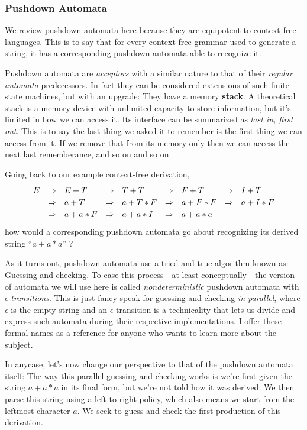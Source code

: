 \documentclass[twoside]{article}
\newcommand{\RA}{\Rightarrow}
\newcommand{\strong}[1]{{\bfseries #1}}
\begin{document}
\subsubsection*{Pushdown Automata}

We review pushdown automata here because they are equipotent to context-free languages. This is to say that for every
context-free grammar used to generate a string, it has a corresponding pushdown automata able to recognize it.

Pushdown automata are \emph{acceptors} with a similar nature to that of their \emph{regular automata} predecessors.
In fact they can be considered extensions of such finite state machines, but with an upgrade: They have a memory
\strong{stack}. A theoretical stack is a memory device with unlimited capacity to store information, but it's
limited in how we can access it. Its interface can be summarized as \emph{last in, first out}. This is to say
the last thing we asked it to remember is the first thing we can access from it. If we remove that from its
memory only then we can access the next last rememberance, and so on and so on.

Going back to our example context-free derivation,
$$ \def\arraystretch{1.2}
\begin{array}{rclllllll}
E	& \RA & E+T	& \RA & T+T	& \RA & F+T	& \RA & I+T		\\
	& \RA & a+T	& \RA & a+T*F	& \RA & a+F*F	& \RA & a+I*F		\\
	& \RA & a+a*F	& \RA & a+a*I	& \RA & a+a*a
\end{array} $$
how would a corresponding pushdown automata go about recognizing its derived string ``$ a+a*a $'' ?

As it turns out, pushdown automata use a tried-and-true algorithm known as: Guessing and checking. To ease this
process---at least conceptually---the version of automata we will use here is called \emph{nondeterministic}
pushdown automata with $ \epsilon $-\emph{transitions}. This is just fancy speak for guessing and checking
\emph{in parallel}, where $ \epsilon $ is the empty string and an $ \epsilon $-transition is a technicality
that lets us divide and express such automata during their respective implementations. I offer these formal
names as a reference for anyone who wants to learn more about the subject.

In anycase, let's now change our perspective to that of the pushdown automata itself: The way this parallel guessing
and checking works is we're first given the string $ a+a*a $ in its final form, but we're not told how it was derived.
We then parse this string using a left-to-right policy, which also means we start from the leftmost character $ a $.
We seek to guess and check the first production of this derivation.
\end{document}
